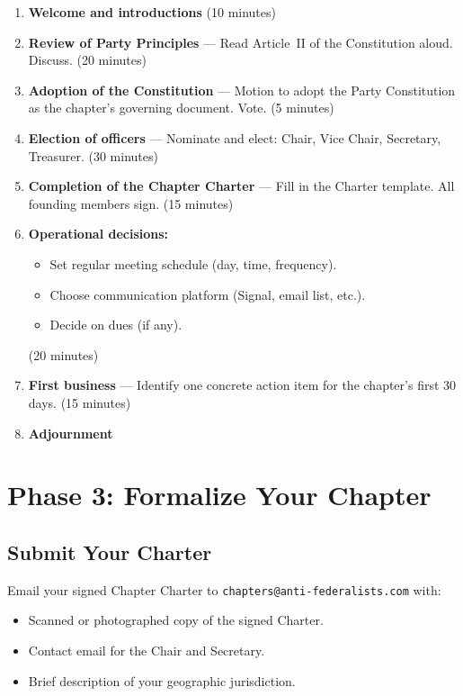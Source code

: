 \documentclass[11pt, letterpaper]{article}
\begin{document}
\begin{enumerate}
  \item \textbf{Welcome and introductions} (10 minutes)
  \item \textbf{Review of Party Principles} --- Read Article~II of the Constitution aloud. Discuss. (20 minutes)
  \item \textbf{Adoption of the Constitution} --- Motion to adopt the Party Constitution as the chapter's governing document. Vote. (5 minutes)
  \item \textbf{Election of officers} --- Nominate and elect: Chair, Vice Chair, Secretary, Treasurer. (30 minutes)
  \item \textbf{Completion of the Chapter Charter} --- Fill in the Charter template. All founding members sign. (15 minutes)
  \item \textbf{Operational decisions:}
    \begin{itemize}
      \item Set regular meeting schedule (day, time, frequency).
      \item Choose communication platform (Signal, email list, etc.).
      \item Decide on dues (if any).
    \end{itemize}
    (20 minutes)
  \item \textbf{First business} --- Identify one concrete action item for the chapter's first 30 days. (15 minutes)
  \item \textbf{Adjournment}
\end{enumerate}


\section{Phase 3: Formalize Your Chapter}

\subsection{Submit Your Charter}
Email your signed Chapter Charter to \texttt{chapters@anti-federalists.com} with:
\begin{itemize}
  \item Scanned or photographed copy of the signed Charter.
  \item Contact email for the Chair and Secretary.
  \item Brief description of your geographic jurisdiction.
\end{itemize}
\end{document}
